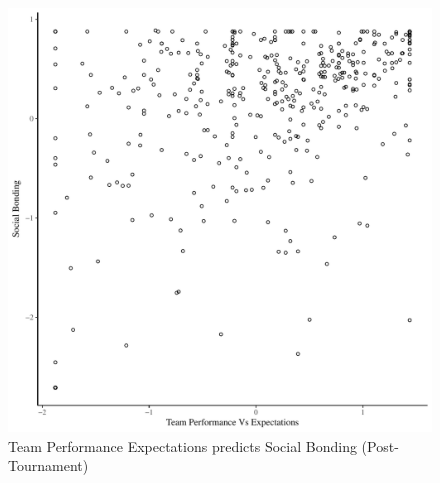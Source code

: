 \begin{CJK}{UTF8}{gbsn}
  \begin{figure}[htbp]
    \centering
  \includegraphics[scale=.5]{images/teamPerfBondOverallBasicXY.pdf}
    \caption{Team Performance Expectations predicts Social Bonding (Post-Tournament)}
    \label{fig:teamPerfBondOverallBasicXY}
  \end{figure}



\end{CJK}
